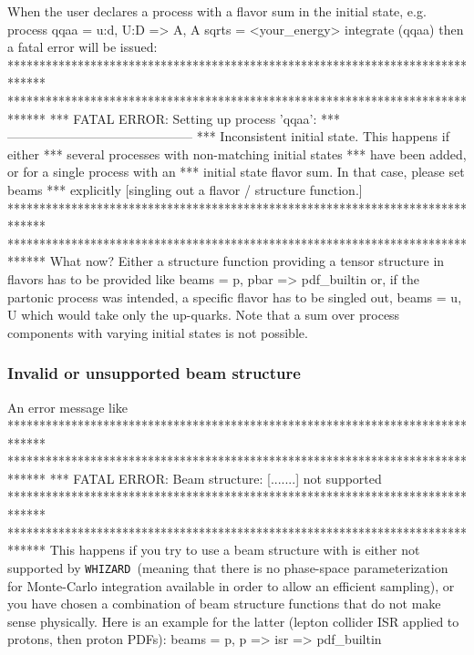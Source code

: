 \documentclass[12pt]{book}
\newenvironment{code}%
  {\begingroup\footnotesize
   \quote
   \Verbatim}%
  {\endVerbatim
   \endquote
   \endgroup\noindent}
\newenvironment{Code}%
  {\begingroup\footnotesize
   \quote
   \Verbatim[frame=single]}%
  {\endVerbatim
   \endquote
   \endgroup\noindent}
\newcommand{\ttt}[1]{\texttt{#1}}
\newcommand{\whizard}{\ttt{WHIZARD}}
\begin{document}
When the user declares a process with a flavor sum in the initial
state, e.g.
\begin{code}
process qqaa = u:d, U:D => A, A
sqrts = <your_energy>
integrate (qqaa)
\end{code}
then a fatal error will be issued:
\begin{Code}
******************************************************************************
******************************************************************************
*** FATAL ERROR: Setting up process 'qqaa':
***                 --------------------------------------------
***              Inconsistent initial state. This happens if either
***              several processes with non-matching initial states
***              have been added, or for a single process with an
***              initial state flavor sum. In that case, please set beams
***              explicitly [singling out a flavor / structure function.]
******************************************************************************
******************************************************************************
\end{Code}
What now? Either a structure function providing a tensor structure in
flavors has to be provided like
\begin{code}
beams = p, pbar => pdf_builtin
\end{code}
or, if the partonic process was intended, a specific flavor has to be
singled out,
\begin{code}
beams = u, U
\end{code}
which would take only the up-quarks. Note that a sum over process
components with varying initial states is not possible.

\subsubsection{Invalid or unsupported beam structure}

An error message like
\begin{Code}
******************************************************************************
******************************************************************************
*** FATAL ERROR: Beam structure: [.......] not supported
******************************************************************************
******************************************************************************
\end{Code}
This happens if you try to use a beam structure with is either not
supported by \whizard\ (meaning that there is no phase-space
parameterization for Monte-Carlo integration available in order to
allow an efficient sampling), or you have chosen a combination of beam
structure functions that do not make sense physically. Here is an
example for the latter (lepton collider ISR applied to protons, then
proton PDFs):
\begin{code}
beams = p, p => isr => pdf_builtin
\end{code}
\end{document}

